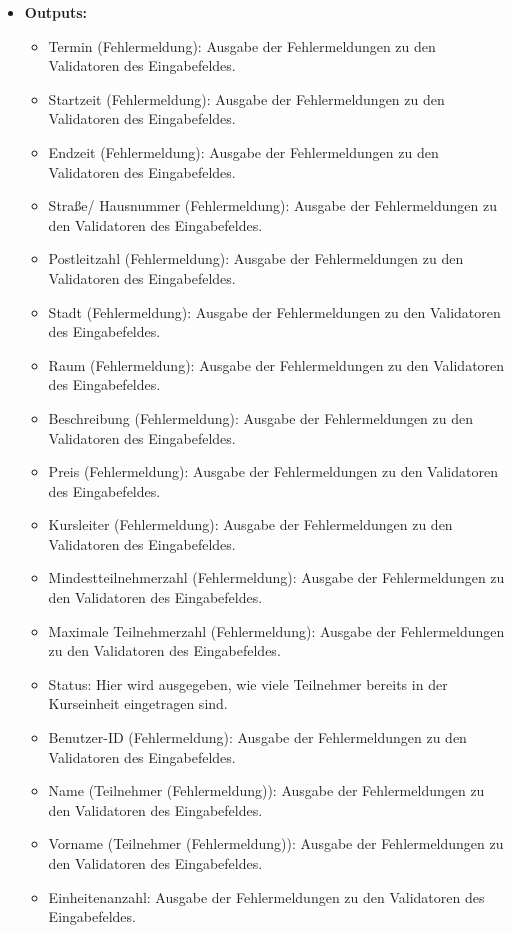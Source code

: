 \begin{itemize}
			\item \textbf{Outputs:}
				\begin{itemize}
					\item Termin (Fehlermeldung): Ausgabe der Fehlermeldungen zu den Validatoren des Eingabefeldes.
					\item Startzeit (Fehlermeldung): Ausgabe der Fehlermeldungen zu den Validatoren des Eingabefeldes.
					\item Endzeit (Fehlermeldung): Ausgabe der Fehlermeldungen zu den Validatoren des Eingabefeldes.
					\item Straße/ Hausnummer (Fehlermeldung): Ausgabe der Fehlermeldungen zu den Validatoren des Eingabefeldes.
					\item Postleitzahl (Fehlermeldung): Ausgabe der Fehlermeldungen zu den Validatoren des Eingabefeldes.
					\item Stadt (Fehlermeldung): Ausgabe der Fehlermeldungen zu den Validatoren des Eingabefeldes.
					\item Raum (Fehlermeldung): Ausgabe der Fehlermeldungen zu den Validatoren des Eingabefeldes.
					\item Beschreibung (Fehlermeldung): Ausgabe der Fehlermeldungen zu den Validatoren des Eingabefeldes.
					\item Preis (Fehlermeldung): Ausgabe der Fehlermeldungen zu den Validatoren des Eingabefeldes.
					\item Kursleiter (Fehlermeldung): Ausgabe der Fehlermeldungen zu den Validatoren des Eingabefeldes.
					\item Mindestteilnehmerzahl (Fehlermeldung): Ausgabe der Fehlermeldungen zu den Validatoren des Eingabefeldes.
					\item Maximale Teilnehmerzahl (Fehlermeldung): Ausgabe der Fehlermeldungen zu den Validatoren des Eingabefeldes.
					\item Status: Hier wird ausgegeben, wie viele Teilnehmer bereits in der Kurseinheit eingetragen sind.
					\item Benutzer-ID (Fehlermeldung): Ausgabe der Fehlermeldungen zu den Validatoren des Eingabefeldes.
					\item Name (Teilnehmer (Fehlermeldung)): Ausgabe der Fehlermeldungen zu den Validatoren des Eingabefeldes.
					\item Vorname (Teilnehmer (Fehlermeldung)): Ausgabe der Fehlermeldungen zu den Validatoren des Eingabefeldes.
					\item Einheitenanzahl: Ausgabe der Fehlermeldungen zu den Validatoren des Eingabefeldes.
				\end{itemize}
				

\end{itemize}
